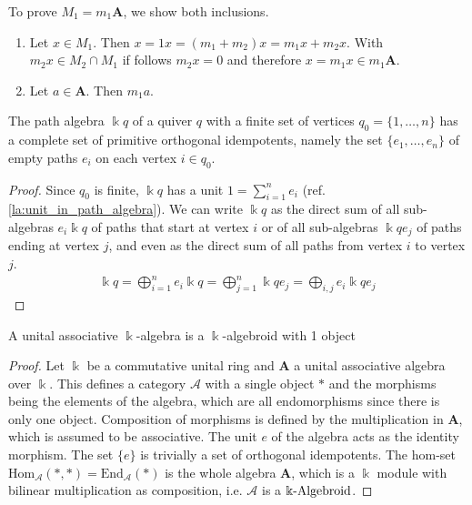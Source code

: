 To prove $M_{1} = m_{1}\mathbf{A}$, we show both inclusions.
\begin{enumerate}
\renewcommand{\labelenumi}{(``$\subseteq$'')}
\item Let $x \in M_{1}$. Then $x = 1x = (m_{1}+m_{2})x = m_{1}x + m_{2}x$. With $m_{2}x \in M_{2}\cap M_{1}$ if follows $m_{2}x = 0$
and therefore $x = m_{1}x \in m_{1}\mathbf{A}$.
\renewcommand{\labelenumi}{(``$\supseteq$'')}
\item Let $a \in \mathbf{A}$. Then $m_{1}a$.
\end{enumerate}

\begin{remark}
The path algebra $\Bbbk q$ of a quiver $q$ with a finite set of vertices $q_{0} = \{1,\dots,n\}$ has a complete set of
primitive orthogonal idempotents, namely the set $\{e_{1},\dots,e_{n}\}$ of empty paths $e_{i}$ on each vertex $i \in q_{0}$.
\end{remark}
\begin{proof}
Since $q_{0}$ is finite, $\Bbbk q$ has a unit $1 = \sum_{i=1}^{n} e_{i}$ (ref. \ref{la:unit_in_path_algebra}). We can write $\Bbbk q$ as the
direct sum of all sub-algebras $e_{i} \Bbbk q$ of paths that start at vertex $i$ or of all sub-algebras $\Bbbk q e_{j}$ of paths ending at vertex $j$,
and even as the direct sum of all paths from vertex $i$ to vertex $j$.
\begin{align}
\Bbbk q = \bigoplus_{i=1}^{n} e_{i} \Bbbk q = \bigoplus_{j=1}^{n} \Bbbk q e_{j} = \bigoplus_{i, j} e_{i} \Bbbk q e_{j} 
\end{align}
\end{proof}

\begin{proposition}
A unital associative $\Bbbk$-algebra is a $\Bbbk$-algebroid with 1 object
\end{proposition}
\begin{proof}
Let $\Bbbk$ be a commutative unital ring and $\mathbf{A}$ a unital associative algebra over $\Bbbk$. This defines a category $\mathcal{A}$
with a single object $\ast$ and the morphisms being the elements of the algebra, which are all endomorphisms since there is only one object.
Composition of morphisms is defined by the multiplication in $\mathbf{A}$, which is assumed to be associative.
The unit $e$ of the algebra acts as the identity morphism. The set $\{ e \}$ is trivially a set of orthogonal idempotents.
The hom-set $\mathrm{Hom}_{\mathcal{A}}(\ast,\ast) = \mathrm{End}_{\mathcal{A}}(\ast)$ is the whole algebra $\mathbf{A}$, which is
a $\Bbbk$ module with bilinear multiplication as composition, i.e. $\mathcal{A}$ is a $\Bbbk\textnormal{-}\mathrm{Algebroid}$.
\end{proof}

